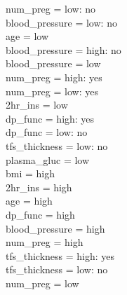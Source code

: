 \documentclass[12pt]{article}
\begin{document}
\textbar\quad \textbar\quad \textbar\quad \textbar\quad \textbar\quad \textbar\quad \textbar\quad num\_preg = low: no\\
\textbar\quad \textbar\quad \textbar\quad \textbar\quad \textbar\quad \textbar\quad blood\_pressure = low: no\\
\textbar\quad \textbar\quad \textbar\quad \textbar\quad \textbar\quad age = low\\
\textbar\quad \textbar\quad \textbar\quad \textbar\quad \textbar\quad \textbar\quad blood\_pressure = high: no\\
\textbar\quad \textbar\quad \textbar\quad \textbar\quad \textbar\quad \textbar\quad blood\_pressure = low\\
\textbar\quad \textbar\quad \textbar\quad \textbar\quad \textbar\quad \textbar\quad \textbar\quad num\_preg = high: yes\\
\textbar\quad \textbar\quad \textbar\quad \textbar\quad \textbar\quad \textbar\quad \textbar\quad num\_preg = low: yes\\
\textbar\quad \textbar\quad \textbar\quad 2hr\_ins = low\\
\textbar\quad \textbar\quad \textbar\quad \textbar\quad dp\_func = high: yes\\
\textbar\quad \textbar\quad \textbar\quad \textbar\quad dp\_func = low: no\\
\textbar\quad \textbar\quad tfs\_thickness = low: no\\
plasma\_gluc = low\\
\textbar\quad bmi = high\\
\textbar\quad \textbar\quad 2hr\_ins = high\\
\textbar\quad \textbar\quad \textbar\quad age = high\\
\textbar\quad \textbar\quad \textbar\quad \textbar\quad dp\_func = high\\
\textbar\quad \textbar\quad \textbar\quad \textbar\quad \textbar\quad blood\_pressure = high\\
\textbar\quad \textbar\quad \textbar\quad \textbar\quad \textbar\quad \textbar\quad num\_preg = high\\
\textbar\quad \textbar\quad \textbar\quad \textbar\quad \textbar\quad \textbar\quad \textbar\quad tfs\_thickness = high: yes\\
\textbar\quad \textbar\quad \textbar\quad \textbar\quad \textbar\quad \textbar\quad \textbar\quad tfs\_thickness = low: no\\
\textbar\quad \textbar\quad \textbar\quad \textbar\quad \textbar\quad \textbar\quad num\_preg = low\\
\end{document}
